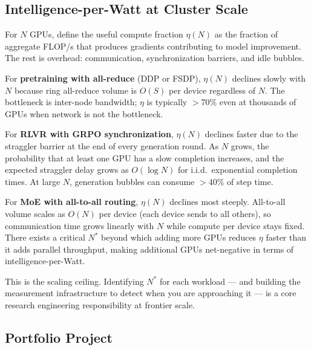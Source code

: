 \subsection*{Intelligence-per-Watt at Cluster Scale}

For $N$ GPUs, define the useful compute fraction $\eta(N)$ as the fraction of aggregate FLOP/s
that produces gradients contributing to model improvement.
The rest is overhead: communication, synchronization barriers, and idle bubbles.

For \textbf{pretraining with all-reduce} (DDP or FSDP), $\eta(N)$ declines slowly with $N$
because ring all-reduce volume is $O(S)$ per device regardless of $N$.
The bottleneck is inter-node bandwidth; $\eta$ is typically $>$70\% even at thousands of GPUs
when network is not the bottleneck.

For \textbf{RLVR with GRPO synchronization}, $\eta(N)$ declines faster due to the straggler
barrier at the end of every generation round.
As $N$ grows, the probability that at least one GPU has a slow completion increases,
and the expected straggler delay grows as $O(\log N)$ for i.i.d.\ exponential completion times.
At large $N$, generation bubbles can consume $>$40\% of step time.

For \textbf{MoE with all-to-all routing}, $\eta(N)$ declines most steeply.
All-to-all volume scales as $O(N)$ per device (each device sends to all others), so communication
time grows linearly with $N$ while compute per device stays fixed.
There exists a critical $N^*$ beyond which adding more GPUs reduces $\eta$ faster than it adds
parallel throughput, making additional GPUs net-negative in terms of intelligence-per-Watt.

This is the scaling ceiling.
Identifying $N^*$ for each workload --- and building the measurement infrastructure to detect when
you are approaching it --- is a core research engineering responsibility at frontier scale.

\subsection*{Portfolio Project}

